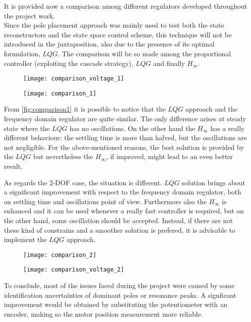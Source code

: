 It is provided now a comparison among different regulators developed throughout the project work. \\ Since the pole placement approach was mainly used to test both the state reconstructors and the state space control scheme, this technique will not be introduced in the juxtaposition, also due to the presence of its optimal formulation, $LQG$.
The comparison will be so made among the proportional controller (exploiting the cascade strategy), $LQG$ and finally $H_{\infty}$.
\begin{figure*}[h]
	\centering
	\begin{subfigure}{0.45\columnwidth}
		\texttt{[image: comparison\_voltage\_1]}
	\end{subfigure}
	\begin{subfigure}{0.45\columnwidth}
		\texttt{[image: comparison\_1]}
	\end{subfigure}
	\caption{Different control tecnhiques for the 1 DOF case}
	\label{fig:comparison1}
\end{figure*}

\par From \cref{fig:comparison1} it is possible to notice that the $LQG$ approach and the frequency domain regulator are quite similar. The only difference arises at steady state where the $LQG$ has no oscillations. On the other hand the $H_{\infty}$ has a really different behaviour: the settling time is more than halved, but the oscillations are not negligible. For the above-mentioned reasons, the best solution is provided by the $LQG$ but nevertheless the $H_{\infty}$, if improved, might lead to an even better result.
\par
As regards the 2-DOF case, the situation is different. $LQG$ solution brings about a significant improvement with respect to the frequency domain regulator, both on settling time and oscillations point of view. Furthermore also the $H_{\infty}$ is enhanced and it can be used whenever a really fast controller is required, but on the other hand, some oscillation should be accepted. Instead, if there are not these kind of constrains and a smoother solution is prefered, it is advisable to implement the $LQG$ approach.

\begin{figure*}[h]
	\centering
	\begin{subfigure}{0.45\columnwidth}
		\texttt{[image: comparison\_2]}
	\end{subfigure}
	\begin{subfigure}{0.45\columnwidth}
		\texttt{[image: comparison\_voltage\_2]}
	\end{subfigure}
	\caption{Different control tecnhiques for the 2 DOF case}
	\label{fig:comparison1}
\end{figure*}
\par
To conclude, most of the issues faced during the project were caused by some identification uncertainties of dominant poles or resonance peaks.
A signficant improvement would be obtained by substituting the potentiometer with an encoder, making so the motor position measurement more reliable.